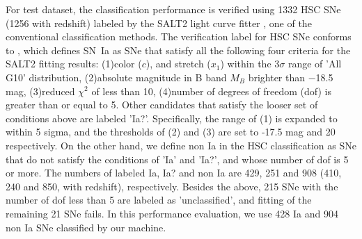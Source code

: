 \documentclass[useamsfonts]{pasj01}
\begin{document}
For test dataset, the classification performance is verified using 1332 HSC SNe (1256 with redshift) labeled by the SALT2 light curve fitter \citep{guy2007,guy10b}, one of the conventional classification methods.
The verification label for HSC SNe conforms to \citet{yasuda19a}, which defines SN~Ia as SNe that satisfy all the following four criteria for the SALT2 fitting results:
(1)color ($c$), and stretch ($x_1$) within the $3\sigma$ range of \citet{scolnickessler2016} 'All G10' distribution, 
(2)absolute magnitude in B band $M_B$ brighter than −18.5 mag, 
(3)reduced $\chi ^{2}$ of less than 10,
(4)number of degrees of freedom (dof) is greater than or equal to 5.
Other candidates that satisfy the looser set of conditions above are labeled 'Ia?'.
Specifically, the range of (1) is expanded to within 5 sigma, and the thresholds of (2) and (3) are set to -17.5 mag and 20 respectively.
On the other hand, we define non Ia in the HSC classification as SNe that do not satisfy the conditions of 'Ia' and 'Ia?', and whose number of dof is 5 or more.
The numbers of labeled Ia, Ia? and non Ia are 429, 251 and 908 (410, 240 and 850, with redshift), respectively.
Besides the above, 215 SNe with the number of dof less than 5 are labeled as 'unclassified', and fitting of the remaining 21 SNe fails.
In this performance evaluation, we use 428 Ia and 904 non Ia SNe classified by our machine.
\end{document}
